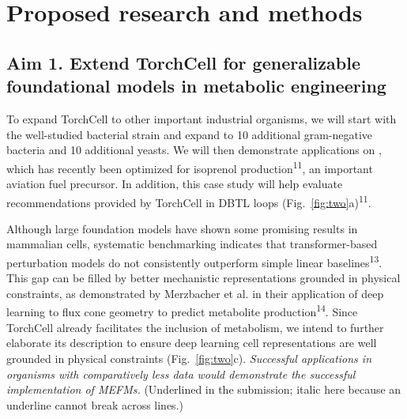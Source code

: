 
\section{Proposed research and methods}\label{sec:methods}

\subsection{Aim 1. Extend TorchCell for generalizable foundational models in
metabolic engineering}\label{sec:aim1}

To expand TorchCell to other important industrial organisms, we will start with the
well-studied bacterial strain  and expand to 10 additional
gram-negative bacteria and 10 additional yeasts. We will then demonstrate
applications on , which has recently been optimized for
isoprenol production\textsuperscript{11}, an important aviation fuel precursor. In
addition, this case study will help evaluate recommendations provided by TorchCell in
DBTL loops (Fig.~\ref{fig:two}a)\textsuperscript{11}.

Although large foundation models have shown some promising results in mammalian
cells, systematic benchmarking indicates that transformer-based perturbation models
do not consistently outperform simple linear baselines\textsuperscript{13}. This gap
can be filled by better mechanistic representations grounded in physical
constraints, as demonstrated by Merzbacher et al. in their application of deep
learning to flux cone geometry to predict metabolite
production\textsuperscript{14}. Since TorchCell already facilitates the inclusion of
metabolism, we intend to further elaborate its description to ensure deep learning
cell representations are well grounded in physical constraints
(Fig.~\ref{fig:two}c). \emph{Successful applications in organisms with
comparatively less data would demonstrate the successful implementation of MEFMs.}
(Underlined in the submission; italic here because an underline cannot break
across lines.)

